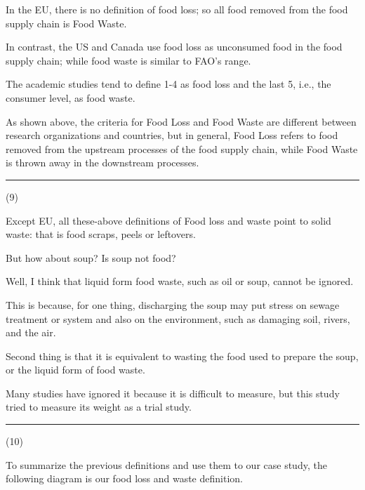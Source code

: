 \documentclass{article}
\begin{document}
\begin{multicols}{2}
\begin{spacing}{1.1}
\vspace{1em}

In the EU, 
there is no definition of food loss; so
all food removed from the food supply chain is Food Waste.

\vspace{1em}

In contrast, 
the US and Canada use food loss as unconsumed food in the food supply chain;
while food waste is similar to FAO's range.

\vspace{1em}

The academic studies tend to define 1-4 as food loss and the last 5, 
i.e., the consumer level, as food waste.

\vspace{1em}

As shown above, 
the criteria for Food Loss and Food Waste are different 
between research organizations and countries, 
but in general, 
Food Loss refers to food removed from the upstream processes of the food supply chain,
while Food Waste is thrown away in the downstream processes.

\noindent\rule{0.1\textwidth}{1pt}\small(9)

Except EU, 
all these-above definitions of Food loss and waste point to solid waste:
that is food scraps, peels or leftovers.

But how about soup?
Is soup not food?

Well, I think that liquid form food waste, such as oil or soup, cannot be ignored.

\vspace{1em}

This is because, for one thing, 
discharging the soup may put stress on sewage treatment or system and 
also on the environment, such as damaging soil, rivers, and the air.

Second thing is that it is equivalent to wasting the food used to prepare the soup, or the liquid form of food waste.

Many studies have ignored it because it is difficult to measure, 
but this study tried to measure its weight as a trial study.

\noindent\rule{0.2\textwidth}{1pt}(10)

To summarize the previous definitions and use them to our case study, 
the following diagram is our food loss and waste definition.


\end{spacing}
\end{multicols}
\end{document}
